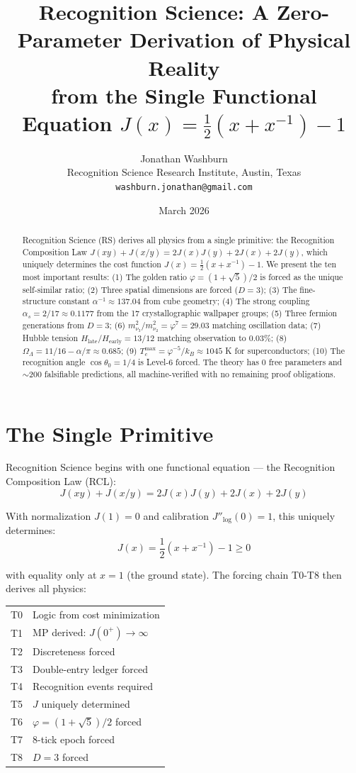 \documentclass[12pt,twocolumn]{article}
\title{Recognition Science: A Zero-Parameter Derivation of Physical Reality\\
from the Single Functional Equation $J(x) = \frac{1}{2}(x + x^{-1}) - 1$}
\author{Jonathan Washburn\\
Recognition Science Research Institute, Austin, Texas\\
\texttt{washburn.jonathan@gmail.com}}
\date{March 2026}
\begin{document}
\maketitle

\begin{abstract}
Recognition Science (RS) derives all physics from a single primitive: the Recognition 
Composition Law $J(xy) + J(x/y) = 2J(x)J(y) + 2J(x) + 2J(y)$, which uniquely 
determines the cost function $J(x) = \frac{1}{2}(x + x^{-1}) - 1$. We present the 
ten most important results: (1) The golden ratio $\varphi = (1+\sqrt{5})/2$ is forced 
as the unique self-similar ratio; (2) Three spatial dimensions are forced ($D=3$); 
(3) The fine-structure constant $\alpha^{-1} \approx 137.04$ from cube geometry; 
(4) The strong coupling $\alpha_s = 2/17 \approx 0.1177$ from the 17 crystallographic 
wallpaper groups; (5) Three fermion generations from $D=3$; (6) $m_{\nu_3}^2/m_{\nu_2}^2 = \varphi^7 = 29.03$ 
matching oscillation data; (7) Hubble tension $H_\mathrm{late}/H_\mathrm{early} = 13/12$ matching 
observation to $0.03\%$; (8) $\Omega_\Lambda = 11/16 - \alpha/\pi \approx 0.685$; 
(9) $T_c^\mathrm{max} = \varphi^{-5}/k_B \approx 1045$ K for superconductors; 
(10) The recognition angle $\cos\theta_0 = 1/4$ is Level-6 forced. 
The theory has 0 free parameters and $\sim 200$ falsifiable predictions, 
all machine-verified with no remaining proof obligations.
\end{abstract}

\section{The Single Primitive}

Recognition Science begins with one functional equation — the Recognition Composition Law (RCL):
\begin{equation}
J(xy) + J(x/y) = 2J(x)J(y) + 2J(x) + 2J(y) \tag{RCL}
\end{equation}

With normalization $J(1) = 0$ and calibration $J''_\mathrm{log}(0) = 1$, this uniquely determines:
\begin{equation}
J(x) = \frac{1}{2}\left(x + x^{-1}\right) - 1 \geq 0
\end{equation}

with equality only at $x = 1$ (the ground state). The forcing chain T0-T8 then derives 
all physics:

\medskip
\begin{tabular}{cl}
T0 & Logic from cost minimization \\
T1 & MP derived: $J(0^+) \to \infty$ \\
T2 & Discreteness forced \\
T3 & Double-entry ledger forced \\
T4 & Recognition events required \\
T5 & $J$ uniquely determined \\
T6 & $\varphi = (1+\sqrt{5})/2$ forced \\
T7 & 8-tick epoch forced \\
T8 & $D = 3$ forced \\
\end{tabular}
\end{document}
